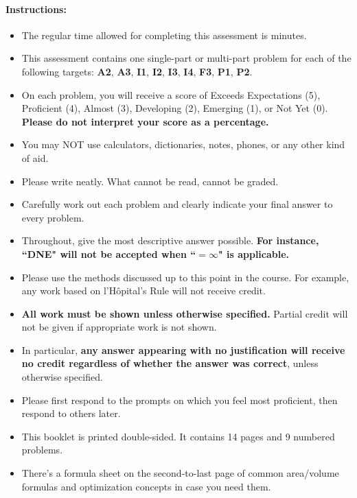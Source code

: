 \documentclass[11pt]{article}
\begin{document}
{%

\paragraph*{Instructions:}

\begin{itemize}
    
    \item The regular time allowed for completing this assessment is  minutes.
    \item This assessment contains one single-part or multi-part problem for each of the following targets:  {\bf\color{RedOrange}A2}, {\bf\color{RedOrange}A3}, {\bf\color{Fuchsia}I1}, {\bf\color{Fuchsia}I2}, {\bf\color{Fuchsia}I3}, {\bf\color{Fuchsia}I4}, {\bf\color{ProcessBlue}F3}, {\bf\color{Orange}P1}, {\bf\color{Orange}P2}.
    \item On each problem, you will receive a score of Exceeds Expectations (5), Proficient (4), Almost (3), Developing (2), Emerging (1), or Not Yet (0). {\bf Please do not interpret your score as a percentage.}
    \item You may NOT use calculators, dictionaries, notes, phones, or any other kind of aid.
    \item Please write neatly. What cannot be read, cannot be graded.
    \item Carefully work out each problem and clearly indicate your final answer to every problem.
    \item Throughout, give the most descriptive answer possible. \textbf{For instance, ``DNE" will not be accepted when ``$=\infty$" is applicable.}
    \item Please use the methods discussed up to this point in the course. For example, any work based on l'H\^opital's Rule will not receive credit.
    \item \textbf{All work must be shown unless otherwise specified.} Partial credit will not be given if appropriate work is not shown.
    \item In particular, {\bf any answer appearing with no justification will receive no credit regardless of whether the answer was correct}, unless otherwise specified.
    \item Please first respond to the prompts on which you feel most proficient, then respond to others later.
    \item This booklet is printed double-sided. It contains 14 pages and 9 numbered problems.
    \item There's a formula sheet on the second-to-last page of common area/volume formulas and optimization concepts in case you need them.
    \end{itemize}
    
}
\end{document}
